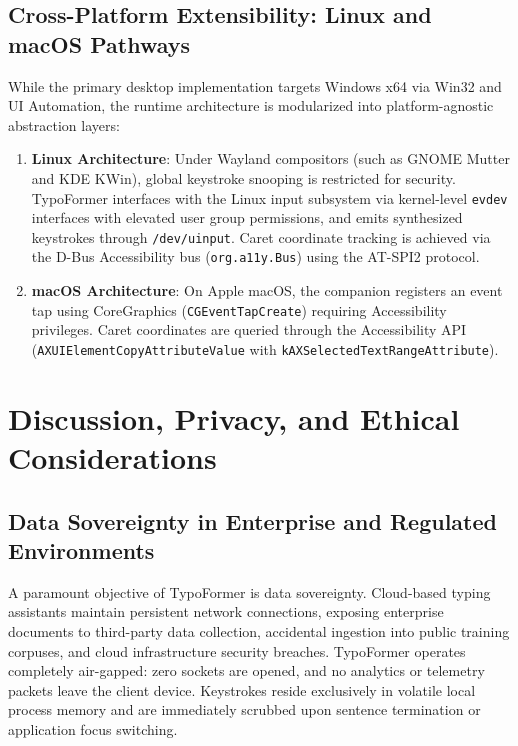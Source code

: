 \documentclass[10pt,journal,compsoc]{IEEEtran}
\begin{document}
\subsection{Cross-Platform Extensibility: Linux and macOS Pathways}
While the primary desktop implementation targets Windows x64 via Win32 and UI Automation, the runtime architecture is modularized into platform-agnostic abstraction layers:
\begin{enumerate}
    \item \textbf{Linux Architecture}: Under Wayland compositors (such as GNOME Mutter and KDE KWin), global keystroke snooping is restricted for security. TypoFormer interfaces with the Linux input subsystem via kernel-level \texttt{evdev} interfaces with elevated user group permissions, and emits synthesized keystrokes through \texttt{/dev/uinput}. Caret coordinate tracking is achieved via the D-Bus Accessibility bus (\texttt{org.a11y.Bus}) using the AT-SPI2 protocol.
    \item \textbf{macOS Architecture}: On Apple macOS, the companion registers an event tap using CoreGraphics (\texttt{CGEventTapCreate}) requiring Accessibility privileges. Caret coordinates are queried through the Accessibility API (\texttt{AXUIElement}\allowbreak\texttt{CopyAttributeValue} with \texttt{kAXSelected}\allowbreak\texttt{TextRangeAttribute}).
\end{enumerate}

\section{Discussion, Privacy, and Ethical Considerations}
\label{sec:ethics}

\subsection{Data Sovereignty in Enterprise and Regulated Environments}
A paramount objective of TypoFormer is data sovereignty. Cloud-based typing assistants maintain persistent network connections, exposing enterprise documents to third-party data collection, accidental ingestion into public training corpuses, and cloud infrastructure security breaches. TypoFormer operates completely air-gapped: zero sockets are opened, and no analytics or telemetry packets leave the client device. Keystrokes reside exclusively in volatile local process memory and are immediately scrubbed upon sentence termination or application focus switching.
\end{document}
